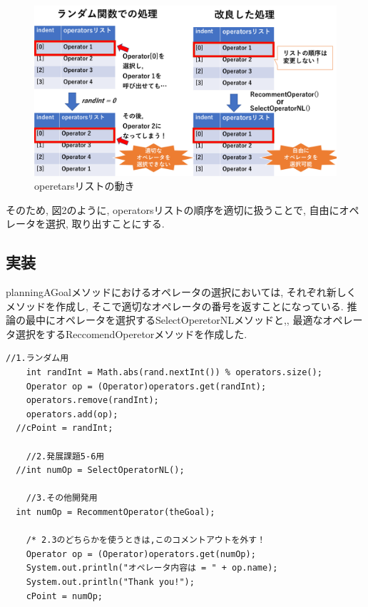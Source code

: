 \documentclass[uplatex,12pt]{jsarticle}
\begin{document}
\begin{figure}[htbp]
 \begin{center}
  \includegraphics[width = 12cm, pagebox = cropbox, clip]{images/random.pdf}
 \end{center}
 \caption[]{operetarsリストの動き}\label{fig:fig1.1}
\end{figure}
そのため, 図2のように, operatorsリストの順序を適切に扱うことで, 自由にオペレータを選択, 取り出すことにする.


\subsection{実装}
planningAGoalメソッドにおけるオペレータの選択においては, それぞれ新しくメソッドを作成し, そこで適切なオペレータの番号を返すことになっている. 推論の最中にオペレータを選択するSelectOperetorNLメソッドと,, 最適なオペレータ選択をするReccomendOperetorメソッドを作成した.
\begin{lstlisting}[caption=オペレータ選択, label=src:No1]
	//1.ランダム用
	int randInt = Math.abs(rand.nextInt()) % operators.size();
  	Operator op = (Operator)operators.get(randInt);
	operators.remove(randInt);
	operators.add(op);
  //cPoint = randInt;
  
	//2.発展課題5-6用
  //int numOp = SelectOperatorNL();
  
	//3.その他開発用
  int numOp = RecommentOperator(theGoal);
  
	/* 2.3のどちらかを使うときは,このコメントアウトを外す！
	Operator op = (Operator)operators.get(numOp);
	System.out.println("オペレータ内容は = " + op.name);
	System.out.println("Thank you!");
	cPoint = numOp;
\end{lstlisting}
\end{document}

